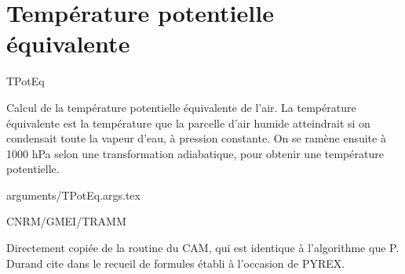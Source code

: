 %
\section{Temp\'erature potentielle \'equivalente }

 {\sf TPotEq}

Calcul de la temp\'erature potentielle \'equivalente de l'air.
La temp\'erature \'equivalente est la temp\'erature que la parcelle
d'air humide atteindrait si on condensait toute la vapeur
d'eau, \`a pression constante. On se ram\`ene ensuite \`a 1000 hPa
selon une transformation adiabatique, pour obtenir une temp\'erature
potentielle.

\bigskip
 {arguments/TPotEq.args.tex}







CNRM/GMEI/TRAMM

Directement copi\'ee de la routine du CAM, qui est identique 
\`a l'algorithme que P. Durand cite dans le recueil de formules
\'etabli \`a l'occasion de PYREX.
